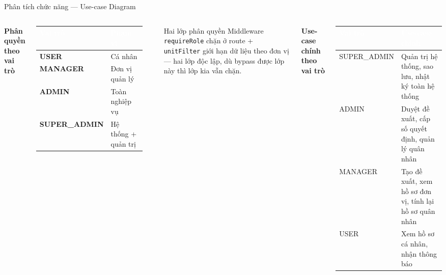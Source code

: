 \documentclass[aspectratio=43,xcolor=table]{beamer}
\begin{document}
\begin{frame}{Phân tích chức năng --- Use-case Diagram}
  \begin{columns}[T,onlytextwidth]
    \textbf{Phân quyền theo vai trò}\\[0.2cm]
    \scriptsize
    \begin{tabular}{|>{\raggedright\arraybackslash}p{2.5cm}|>{\raggedright\arraybackslash}p{2.6cm}|}
      \hline
      \rowcolor{hustred}\textcolor{white}{\textbf{Vai trò}} & \textcolor{white}{\textbf{Phạm vi}} \\ \hline
      \textbf{USER} & Cá nhân \\ \hline
      \textbf{MANAGER} & Đơn vị quản lý \\ \hline
      \textbf{ADMIN} & Toàn nghiệp vụ \\ \hline
      \textbf{SUPER\_ADMIN} & Hệ thống + quản trị \\ \hline
    \end{tabular}\\[0.3cm]

    \begin{block}{Hai lớp phân quyền}
      \scriptsize
      Middleware \texttt{requireRole} chặn ở route + \texttt{unitFilter} giới hạn dữ liệu theo đơn vị --- hai lớp độc lập, dù bypass được lớp này thì lớp kia vẫn chặn.
    \end{block}

    \textbf{Use-case chính theo vai trò}\\[0.2cm]
    \scriptsize
    \begin{tabular}{|>{\raggedright\arraybackslash}p{2cm}|>{\raggedright\arraybackslash}p{4cm}|}
      \hline
      \rowcolor{hustdark}\textcolor{white}{\textbf{Vai trò}} & \textcolor{white}{\textbf{Use-case chính}} \\ \hline
      SUPER\_ADMIN & Quản trị hệ thống, sao lưu, nhật ký toàn hệ thống \\ \hline
      ADMIN & Duyệt đề xuất, cấp số quyết định, quản lý quân nhân \\ \hline
      MANAGER & Tạo đề xuất, xem hồ sơ đơn vị, tính lại hồ sơ quân nhân \\ \hline
      USER & Xem hồ sơ cá nhân, nhận thông báo \\ \hline
    \end{tabular}
  \end{columns}
\end{frame}
\end{document}

